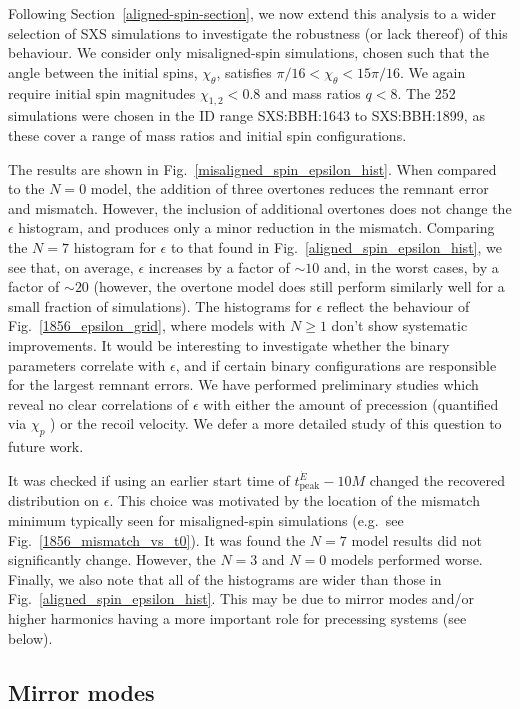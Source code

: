 Following Section~\ref{aligned-spin-section}, we now extend this analysis to a wider selection of SXS simulations to investigate the robustness (or lack thereof) of this behaviour. We consider only misaligned-spin simulations, chosen such that the angle between the initial spins, $\chi_{\theta}$, satisfies $\pi/16 < \chi_{\theta} < 15\pi/16$. We again require initial spin magnitudes $\chi_{1,2} < 0.8$ and mass ratios $q<8$. The 252 simulations were chosen in the ID range SXS:BBH:1643 to SXS:BBH:1899, as these cover a range of mass ratios and initial spin configurations.

The results are shown in Fig.~\ref{misaligned_spin_epsilon_hist}. 
When compared to the $N=0$ model, the addition of three overtones reduces the remnant error and mismatch. 
However, the inclusion of additional overtones does not change the $\epsilon$ histogram, and produces only a minor reduction in the mismatch.
Comparing the $N=7$ histogram for $\epsilon$ to that found in Fig.~\ref{aligned_spin_epsilon_hist}, we see that, on average, $\epsilon$ increases by a factor of $\sim 10$ and, in the worst cases, by a factor of $\sim 20$ (however, the overtone model does still perform similarly well for a small fraction of simulations). 
The histograms for $\epsilon$ reflect the behaviour of Fig.~\ref{1856_epsilon_grid}, where models with $N \geq 1$ don't show systematic improvements. 
It would be interesting to investigate whether the binary parameters correlate with $\epsilon$, and if certain binary configurations are responsible for the largest remnant errors. We have performed preliminary studies which reveal no clear correlations of $\epsilon$ with either the amount of precession (quantified via $\chi_p$ \cite{Schmidt:2014iyl}) or the recoil velocity. We defer a more detailed study of this question to future work.

It was checked if using an earlier start time of $t_{\mathrm{peak}}^{\dot{E}} - 10M$ changed the recovered distribution on $\epsilon$. 
This choice was motivated by the location of the mismatch minimum typically seen for misaligned-spin simulations (e.g.\ see Fig.~\ref{1856_mismatch_vs_t0}). 
It was found the $N=7$ model results did not significantly change. 
However, the $N=3$ and $N=0$ models performed worse.
Finally, we also note that all of the histograms are wider than those in Fig.~\ref{aligned_spin_epsilon_hist}. 
This may be due to mirror modes and/or higher harmonics having a more important role for precessing systems (see below). 


\subsection{Mirror modes} \label{subsec:misaligned_mirror_modes}

